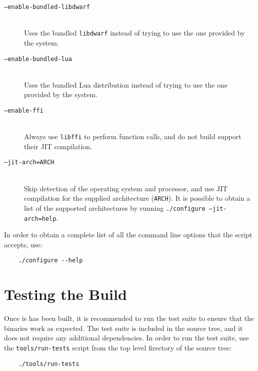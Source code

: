 \begin{description}

	\item [\texttt{--enable-bundled-libdwarf}] \hfill\\
		Uses the bundled \verb|libdwarf| instead of trying to use the one
		provided by the system.

	\item [\texttt{--enable-bundled-lua}] \hfill\\
		Uses the bundled Lua distribution instead of trying to use the one
		provided by the system.

	\item [\texttt{--enable-ffi}] \hfill\\
		Always use \verb|libffi| to perform function calls, and do not build
		support their JIT compilation.

	\item [\texttt{--jit-arch=ARCH}] \hfill\\
		Skip detection of the operating system and processor, and use JIT
		compilation for the supplied architecture (\verb|ARCH|). It is
		possible to obtain a list of the supported architectures by running
		\texttt{./configure --jit-arch=help}.

\end{description}

In order to obtain a complete list of all the command line options that the
script accepts, use:

\begin{verbatim}
	./configure --help
\end{verbatim}


\section{Testing the Build}

Once \Eol* is has been built, it is recommended to run the test suite to
ensure that the binaries work as expected. The test suite is included in the
source tree, and it does not require any additional dependencies. In order
to run the test suite, use the \verb|tools/run-tests| script from the
top level firectory of the source tree:

\begin{verbatim}
	./tools/run-tests
\end{verbatim}
